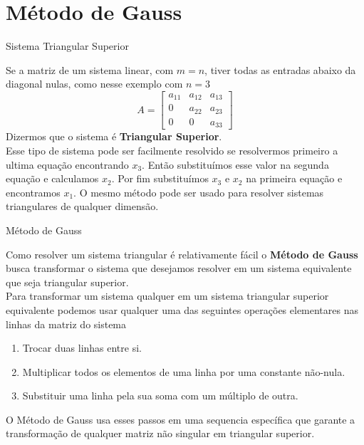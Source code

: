 \section{Método de Gauss}

\begin{teoria}{Sistema Triangular Superior}
    
    Se a matriz de um sistema linear, com $m=n$, tiver todas as entradas abaixo da diagonal nulas, como nesse exemplo com $n=3$
    \[ A = \left[
        \begin{array}{ccc}
            a_{11} & a_{12} & a_{13} \\ 
            0      & a_{22} & a_{23} \\ 
            0      & 0      & a_{33}
        \end{array} 
        \right]
    \]    
    Dizermos que o sistema é \textbf{Triangular Superior}.
    \\
    
    Esse tipo de sistema pode ser facilmente resolvido se resolvermos primeiro a ultima equação encontrando $x_3$.
    Então substituímos esse valor na segunda equação e calculamos $x_2$. Por fim substituímos $x_3$ e $x_2$ na primeira
    equação e encontramos $x_1$. O mesmo método pode ser usado para resolver sistemas triangulares de qualquer dimensão.
    
\end{teoria}

\begin{teoria}{Método de Gauss}

    Como resolver um sistema triangular é relativamente fácil o \textbf{Método de Gauss} busca transformar
    o sistema que desejamos resolver em um sistema equivalente que seja triangular superior.
    \\

    Para transformar um sistema qualquer em um sistema triangular superior equivalente podemos usar qualquer uma das seguintes operações elementares nas linhas da matriz do sistema
    \begin{enumerate}
        \item Trocar duas linhas entre si.
        \item Multiplicar todos os elementos de uma linha por uma constante não-nula.
        \item Substituir uma linha pela sua soma com um múltiplo de outra.
    \end{enumerate}
        
    O Método de Gauss usa esses passos em uma sequencia específica que garante a transformação de qualquer matriz não singular em triangular superior.
        
\end{teoria}

